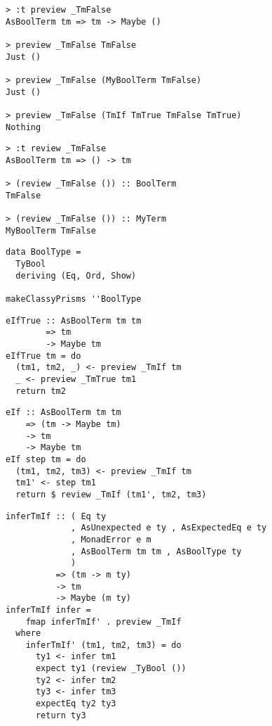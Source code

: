 \documentclass{beamer}
\begin{document}
\begin{frame}[fragile]
  \begin{verbatim}
> :t preview _TmFalse
AsBoolTerm tm => tm -> Maybe ()

> preview _TmFalse TmFalse
Just ()

> preview _TmFalse (MyBoolTerm TmFalse)
Just ()

> preview _TmFalse (TmIf TmTrue TmFalse TmTrue)
Nothing
  \end{verbatim}
\end{frame} 

\begin{frame}[fragile]
  \begin{verbatim}
> :t review _TmFalse
AsBoolTerm tm => () -> tm

> (review _TmFalse ()) :: BoolTerm
TmFalse

> (review _TmFalse ()) :: MyTerm
MyBoolTerm TmFalse
  \end{verbatim}
\end{frame} 

\begin{frame}[fragile]
  \begin{verbatim}
data BoolType =
  TyBool
  deriving (Eq, Ord, Show)

makeClassyPrisms ''BoolType
  \end{verbatim}
\end{frame} 

\begin{frame}[fragile]
  \begin{verbatim}
eIfTrue :: AsBoolTerm tm tm
        => tm
        -> Maybe tm
eIfTrue tm = do
  (tm1, tm2, _) <- preview _TmIf tm
  _ <- preview _TmTrue tm1
  return tm2
  \end{verbatim}
\end{frame} 

\begin{frame}[fragile]
  \begin{verbatim}
eIf :: AsBoolTerm tm tm
    => (tm -> Maybe tm)
    -> tm
    -> Maybe tm
eIf step tm = do
  (tm1, tm2, tm3) <- preview _TmIf tm
  tm1' <- step tm1
  return $ review _TmIf (tm1', tm2, tm3)
  \end{verbatim}
\end{frame} 

\begin{frame}[fragile]
  \begin{verbatim}
inferTmIf :: ( Eq ty
             , AsUnexpected e ty , AsExpectedEq e ty
             , MonadError e m
             , AsBoolTerm tm tm , AsBoolType ty
             )
          => (tm -> m ty)
          -> tm
          -> Maybe (m ty)
inferTmIf infer =
    fmap inferTmIf' . preview _TmIf
  where
    inferTmIf' (tm1, tm2, tm3) = do
      ty1 <- infer tm1
      expect ty1 (review _TyBool ())
      ty2 <- infer tm2
      ty3 <- infer tm3
      expectEq ty2 ty3
      return ty3
  \end{verbatim}
\end{frame} 
\end{document}
